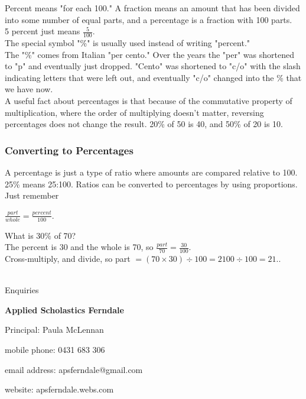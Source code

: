 \documentclass{article}
\begin{document}
\begin{spacing}{1.25}
Percent means "for each 100." A fraction means an amount that has been divided into some number of equal parts, and a percentage is a fraction with 100 parts.\\

5 percent just means $\frac{5}{100}$.\\

The special symbol "\%" is usually used instead of writing "percent."\\

The "\%" comes from Italian "per cento." Over the years the "per" was shortened to "p" and eventually just dropped. "Cento" was shortened to "c/o" with the slash indicating letters that were left out, and eventually "c/o" changed into the \% that we have now.\\

A useful fact about percentages is that because of the commutative property of multiplication, where the order of multiplying doesn't matter, reversing percentages does not change the result. 20\% of 50 is 40, and 50\% of 20 is 10.\\

\subsubsection*{Converting to Percentages}

A percentage is just a type of ratio where amounts are compared relative to 100. 25\% means 25:100. Ratios can be converted to percentages by using proportions.\\

Just remember
\begin{Large}
$\frac{part}{whole}=\frac{percent}{100}$.\\
\end{Large}

What is 30\% of 70?\\
The percent is 30 and the whole is 70, so $\frac{part}{70}=\frac{30}{100}$.\\
Cross-multiply, and divide, so part $= (70 \times 30) \div 100 = 2100 \div 100 = 21$..\\

\
\newpage

\doublespacing

\begin{center}

Enquiries

\textbf{Applied Scholastics Ferndale}

Principal: Paula McLennan

mobile phone: 0431 683 306

email address: apsferndale@gmail.com

website: apsferndale.webs.com

\end{center}

\end{spacing}
\end{document}
